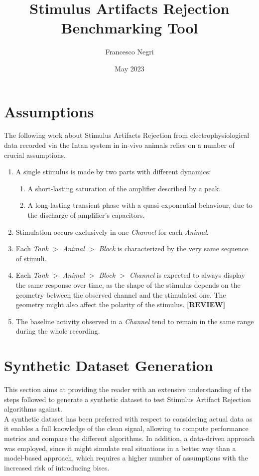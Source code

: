 \documentclass[12pt]{article}
\title{Stimulus Artifacts Rejection Benchmarking Tool}
\author{Francesco Negri}
\date{May 2023}
\begin{document}
\maketitle


\section*{Assumptions}
The following work about Stimulus Artifacts Rejection from electrophysiological data
recorded via the Intan system in in-vivo animals relies on a number of crucial assumptions.
\begin{enumerate}
      \item A single stimulus is made by two parts with different dynamics:
            \begin{enumerate}
                  \item A short-lasting saturation of the amplifier described by a peak.
                  \item A long-lasting transient phase with a quasi-exponential behaviour, due
                        to the discharge of amplifier's capacitors.
            \end{enumerate}
      \item Stimulation occurs exclusively in one \textit{Channel} for each \textit{Animal}.
      \item Each \textit{Tank \(>\) Animal \(>\) Block} is characterized by
            the very same sequence of stimuli.
      \item Each \textit{Tank \(>\) Animal \(>\) Block \(>\) Channel} is expected to
            always display the same response over time, as the shape of the stimulus depends
            on the geometry between the observed channel and the stimulated one. The geometry
            might also affect the polarity of the stimulus. \textbf{[REVIEW]}
      \item The baseline activity observed in a \textit{Channel} tend to remain in the
            same range during the whole recording.
\end{enumerate}

\section*{Synthetic Dataset Generation}
This section aims at providing the reader with an extensive understanding of
the steps followed to generate a synthetic dataset to test Stimulus Artifact Rejection
algorithms against.\\
A synthetic dataset has been preferred with respect to considering
actual data as it enables a full knowledge of the clean signal, allowing to compute
performance metrics and compare the different algorithms. In addition, a data-driven
approach was employed, since it might simulate real situations in a better way than
a model-based approach, which requires a higher number of assumptions with the increased
risk of introducing bises.
\end{document}
